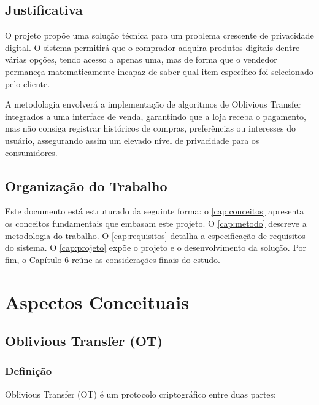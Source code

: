 \documentclass[12pt, oneside, a4paper, english, brazil]{abntex2}
\begin{document}
\section{Justificativa}

O projeto propõe uma solução técnica para um problema crescente de privacidade
digital. O sistema permitirá que o comprador adquira produtos digitais dentre
várias opções, tendo acesso a apenas uma, mas de forma que o vendedor
permaneça matematicamente incapaz de saber qual item específico foi
selecionado pelo cliente.

A metodologia envolverá a implementação de algoritmos de Oblivious Transfer
integrados a uma interface de venda, garantindo que a loja receba o pagamento,
mas não consiga registrar históricos de compras, preferências ou interesses do
usuário, assegurando assim um elevado nível de privacidade para os
consumidores.

\section{Organização do Trabalho}

Este documento está estruturado da seguinte forma: o \autoref{cap:conceitos}
apresenta os conceitos fundamentais que embasam este projeto. O
\autoref{cap:metodo} descreve a metodologia do trabalho. O
\autoref{cap:requisitos} detalha a especificação de requisitos do sistema. O
\autoref{cap:projeto} expõe o projeto e o desenvolvimento da solução. Por fim,
o Capítulo 6 reúne as considerações finais do estudo.

\chapter{Aspectos Conceituais}\label{cap:conceitos}

\section{Oblivious Transfer (OT)}

\subsection{Definição}

Oblivious Transfer (OT) é um protocolo criptográfico entre duas partes:
\end{document}
